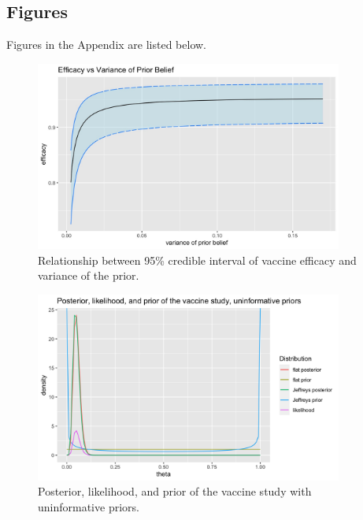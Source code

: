 \documentclass[12pt]{amsart}
\begin{document}
\subsection{Figures}
Figures in the Appendix are listed below.
\begin{figure}[H]
    \centering
    \includegraphics[width = 0.9\textwidth]{EfficacyVSVariance.jpeg}
    \caption{\footnotesize{Relationship between 95\% credible interval of vaccine efficacy and variance of the prior.}}
    \label{fig:my_label}
\end{figure}

\begin{figure}[H]
    \centering
    \includegraphics[width = 0.9\textwidth]{uninformative priors.png}
    \caption{\footnotesize{Posterior, likelihood, and prior of the vaccine study with uninformative priors.}}
    \label{fig: uninformative}
\end{figure}
\end{document}
